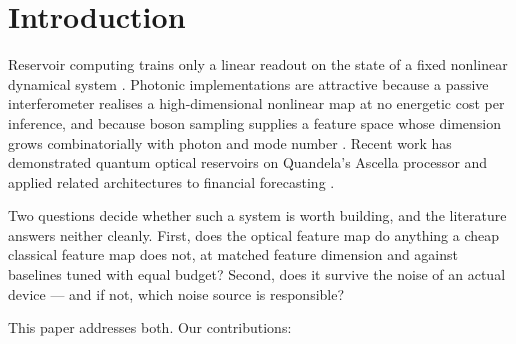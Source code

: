 \documentclass[11pt]{article}
\begin{document}
\section{Introduction}\label{sec:intro}

Reservoir computing trains only a linear readout on the state of a fixed nonlinear dynamical
system \citep{jaeger2001esn, maass2002lsm}. Photonic implementations are attractive because a
passive interferometer realises a high-dimensional nonlinear map at no energetic cost per
inference, and because boson sampling supplies a feature space whose dimension grows
combinatorially with photon and mode number \citep{garciabeni2023scalable,
nerenberg2025photonquarc}. Recent work has demonstrated quantum optical reservoirs on
Quandela's Ascella processor \citep{maring2024ascella} and applied related architectures to
financial forecasting \citep{amanov2026hpqrc, li2025qrcrv}.

Two questions decide whether such a system is worth building, and the literature answers
neither cleanly. First, does the optical feature map do anything a cheap classical feature map
does not, at matched feature dimension and against baselines tuned with equal budget? Second,
does it survive the noise of an actual device --- and if not, which noise source is
responsible?

This paper addresses both. Our contributions:
\end{document}
